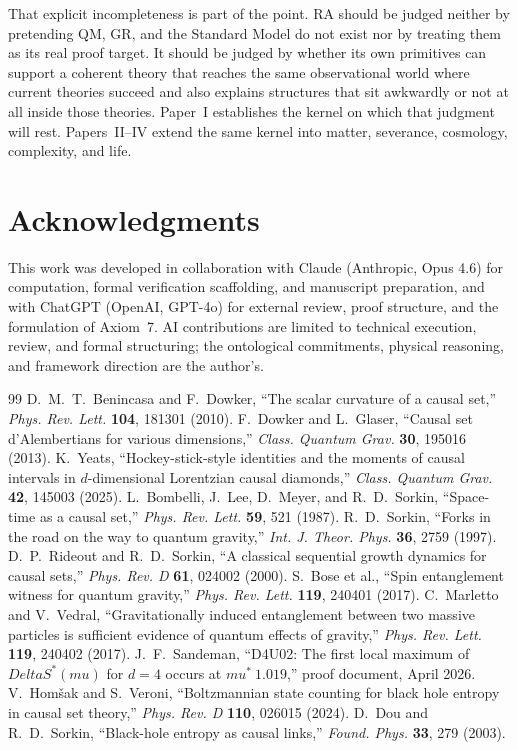 \documentclass[11pt]{article}
\def\Delta{Delta}%
\def\mu{mu}%
\def\approx{~}%
\begin{document}
That explicit incompleteness is part of the point. RA should be judged neither by pretending QM, GR, and the Standard Model do not exist nor by treating them as its real proof target. It should be judged by whether its own primitives can support a coherent theory that reaches the same observational world where current theories succeed and also explains structures that sit awkwardly or not at all inside those theories. Paper~I establishes the kernel on which that judgment will rest. Papers~II--IV extend the same kernel into matter, severance, cosmology, complexity, and life.

\section*{Acknowledgments}

This work was developed in collaboration with Claude (Anthropic, Opus 4.6) for computation, formal verification scaffolding, and manuscript preparation, and with ChatGPT (OpenAI, GPT-4o) for external review, proof structure, and the formulation of Axiom~7. AI contributions are limited to technical execution, review, and formal structuring; the ontological commitments, physical reasoning, and framework direction are the author's.

\begin{thebibliography}{99}
 D.~M.~T.~Benincasa and F.~Dowker, ``The scalar curvature of a causal set,'' \emph{Phys. Rev. Lett.} \textbf{104}, 181301 (2010).
 F.~Dowker and L.~Glaser, ``Causal set d'Alembertians for various dimensions,'' \emph{Class. Quantum Grav.} \textbf{30}, 195016 (2013).
 K.~Yeats, ``Hockey-stick-style identities and the moments of causal intervals in $d$-dimensional Lorentzian causal diamonds,'' \emph{Class. Quantum Grav.} \textbf{42}, 145003 (2025).
 L.~Bombelli, J.~Lee, D.~Meyer, and R.~D.~Sorkin, ``Space-time as a causal set,'' \emph{Phys. Rev. Lett.} \textbf{59}, 521 (1987).
 R.~D.~Sorkin, ``Forks in the road on the way to quantum gravity,'' \emph{Int. J. Theor. Phys.} \textbf{36}, 2759 (1997).
 D.~P.~Rideout and R.~D.~Sorkin, ``A classical sequential growth dynamics for causal sets,'' \emph{Phys. Rev. D} \textbf{61}, 024002 (2000).
 S.~Bose et al., ``Spin entanglement witness for quantum gravity,'' \emph{Phys. Rev. Lett.} \textbf{119}, 240401 (2017).
 C.~Marletto and V.~Vedral, ``Gravitationally induced entanglement between two massive particles is sufficient evidence of quantum effects of gravity,'' \emph{Phys. Rev. Lett.} \textbf{119}, 240402 (2017).
 J.~F.~Sandeman, ``D4U02: The first local maximum of $\Delta S^*(\mu)$ for $d=4$ occurs at $\mu^*\approx 1.019$,'' proof document, April 2026.
 V.~Hom\v{s}ak and S.~Veroni, ``Boltzmannian state counting for black hole entropy in causal set theory,'' \emph{Phys. Rev. D} \textbf{110}, 026015 (2024).
 D.~Dou and R.~D.~Sorkin, ``Black-hole entropy as causal links,'' \emph{Found. Phys.} \textbf{33}, 279 (2003).
\end{thebibliography}
\end{document}
